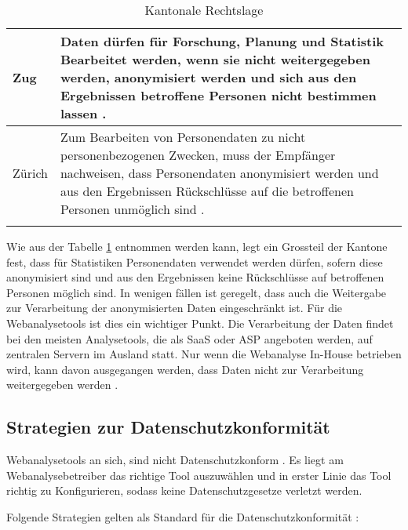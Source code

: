\begin{longtable}{| p{} | p{}|}
		\hline
    Zug & Daten dürfen für Forschung, Planung und Statistik Bearbeitet werden, wenn sie nicht weitergegeben werden, anonymisiert werden und sich aus den Ergebnissen betroffene Personen nicht bestimmen lassen \parencite[§§ 4 Abs 1e]{DSSGZG}. \\
		\hline
    Zürich & Zum Bearbeiten von Personendaten zu nicht personenbezogenen Zwecken, muss der Empfänger nachweisen, dass Personendaten anonymisiert werden und aus den Ergebnissen Rückschlüsse auf die betroffenen Personen unmöglich sind \parencite[§§ 18 Abs. 1-2]{DSSGZH}. \\
		\hline

    \caption{Kantonale Rechtslage}
    \label{tab: ktrechtslage}
	\end{longtable}

  Wie aus der Tabelle \ref{tab: ktrechtslage} entnommen werden kann,
  legt ein Grossteil der Kantone fest, dass für Statistiken Personendaten verwendet werden dürfen, sofern diese anonymisiert sind und aus den Ergebnissen keine Rückschlüsse auf betroffenen Personen möglich sind. In wenigen fällen ist geregelt, dass auch die Weitergabe zur Verarbeitung der anonymisierten Daten eingeschränkt ist. Für die Webanalysetools ist dies ein wichtiger Punkt. Die Verarbeitung der Daten findet bei den meisten Analysetools, die als SaaS oder ASP angeboten werden, auf zentralen Servern im Ausland statt. Nur wenn die Webanalyse In-House betrieben wird, kann davon ausgegangen werden, dass Daten nicht zur Verarbeitung weitergegeben werden \parencite[S 174-176]{nakatani2011toolselectionmethod}.


\subsection{Strategien zur Datenschutzkonformität}
Webanalysetools an sich, sind nicht Datenschutzkonform \parencite[S. 1-4]{EcommerceUndDatenschutz}. Es liegt am Webanalysebetreiber das richtige Tool auszuwählen und in erster Linie das Tool richtig zu Konfigurieren, sodass keine Datenschutzgesetze verletzt werden.

Folgende Strategien gelten als Standard für die Datenschutzkonformität \parencite[S. 2-5]{EcommerceUndDatenschutz}:

